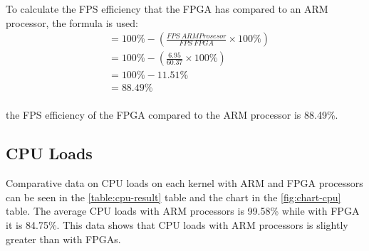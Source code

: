 
To calculate the FPS efficiency that the FPGA has compared to an ARM processor, the formula is used:
\begin{equation*}
    \begin{split}
& = 100\% - \left( \frac{FPS\ ARM Prosesor}{FPS\ FPGA} \times 100\% \right) \\
& = 100\% - \left( \frac{6.95}{60.37} \times 100\% \right) \\
& = 100\% - 11.51\% \\
& = 88.49\% \\
    \end{split}
\end{equation*}


the FPS efficiency of the FPGA compared to the ARM processor is 88.49\%.

\subsection{CPU Loads}


Comparative data on CPU loads on each kernel with ARM and FPGA processors can be seen in the \ref{table:cpu-result} table and the chart in the \ref{fig:chart-cpu} table. The average CPU loads with ARM processors is 99.58\% while with FPGA it is 84.75\%. This data shows that CPU loads with ARM processors is slightly greater than with FPGAs.

